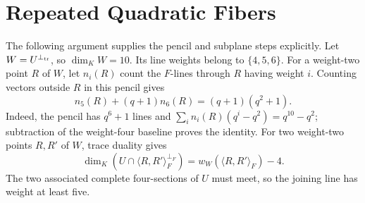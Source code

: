 \documentclass[12pt,letterpaper,onecolumn]{article}
\theoremstyle{definition}
\theoremstyle{remark}
\begin{document}
\section{Repeated Quadratic Fibers}
The following argument supplies the pencil and subplane steps explicitly.
Let \(W=U^{\perp_{\rm tr}}\), so \(\dim_KW=10\).
Its line weights belong to \(\{4,5,6\}\). For a weight-two point \(R\) of \(W\), let \(n_i(R)\) count the \(F\)-lines through \(R\) having weight \(i\). Counting vectors outside \(R\) in this pencil gives
\begin{equation}\label{eq:core-pencil}
n_5(R)+(q+1)n_6(R)=(q+1)(q^2+1).
\end{equation}
Indeed, the pencil has \(q^6+1\) lines and
\(\sum_i n_i(R)(q^i-q^2)=q^{10}-q^2\); subtraction of the weight-four baseline proves the identity.
For two weight-two points \(R,R'\) of \(W\), trace duality gives
\[
\dim_K(U\cap\langle R,R'\rangle_F^{\perp_F})
=w_W(\langle R,R'\rangle_F)-4.
\]
The two associated complete four-sections of \(U\) must meet, so the joining line has weight at least five.
\end{document}

